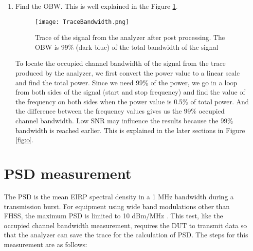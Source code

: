 \begin{enumerate}
\item Find the \ac{OBW}. This is well explained in the Figure \ref{fig:tracebw}.
\begin{figure}[H]
\centering
\texttt{[image: TraceBandwidth.png]}
\caption{Trace of the signal from the analyzer after post processing. The \acs{OBW} is 99\% (dark blue) of the total bandwidth of the signal}
\label{fig:tracebw}
\end{figure}
To locate the occupied channel bandwidth of the signal from the trace produced by the analyzer, we first convert the power value to a linear scale and find the total power. Since we need 99\% of the power, we go in a loop from both sides of the signal (start and stop frequency) and find the value of the frequency on both sides when the power value is 0.5\% of total power. And the difference between the frequency values gives us the 99\% occupied channel bandwidth. Low \acf{SNR} may influence the results because the 99\% bandwidth is reached earlier. This is explained in the later sections in Figure \ref{fig:o}.

\end{enumerate}
  
\section{\acl{PSD} measurement}
\label{sec:psdmeas}
The \acl{PSD} is the mean \acf{EIRP} spectral density in a 1 MHz bandwidth during a transmission burst. For equipment using wide band modulations other than \acs{FHSS}, the maximum \acf{PSD} is limited to 10 dBm/MHz \cite{etsi300328}. This test, like the occupied channel bandwidth measurement, requires the \acs{DUT} to transmit data so that the analyzer can save the trace for the calculation of \acf{PSD}. The steps for this measurement are as follows:


